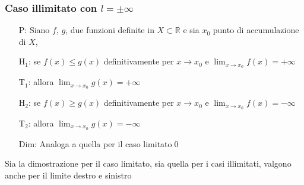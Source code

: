 \documentclass[a4paper]{article}
\begin{document}
\subsubsection*{Caso illimitato con \(l = \pm \infty\)}
\begin{itemize}
	\item[P:] Siano \(f\), \(g\), due funzioni definite in \(X \subset \mathbb{R}\) e sia \(x_0\) punto di accumulazione di \(X\),
	\item[H\(_1\):] se \(f(x) \leq g(x)\) definitivamente per \(x \to x_0\) e \(\displaystyle \lim_{x \to x_0} f(x) = + \infty\)
	\item[T\(_1\):] allora \(\displaystyle \lim_{x \to x_0} g(x) = + \infty\)
	\item[H\(_2\):] se \(f(x) \geq g(x)\) definitivamente per \(x \to x_0\) e \(\displaystyle \lim_{x \to x_0} f(x) = - \infty\)
	\item[T\(_2\):] allora \(\displaystyle \lim_{x \to x_0} g(x) = - \infty\)
	\item[Dim:] Analoga a quella per il caso limitato\qed
\end{itemize}

Sia la dimostrazione per il caso limitato, sia quella per i casi illimitati, valgono anche per il limite destro e sinistro
\end{document}
